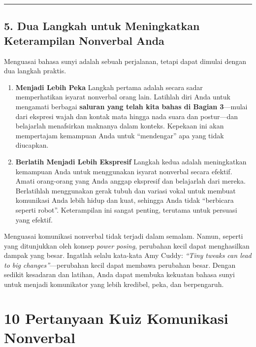 \documentclass[
  letterpaper,
  DIV=11,
  numbers=noendperiod]{scrreprt}
\begin{document}
\begin{center}\rule{0.5\linewidth}{0.5pt}\end{center}

\section{5. Dua Langkah untuk Meningkatkan Keterampilan Nonverbal
Anda}\label{dua-langkah-untuk-meningkatkan-keterampilan-nonverbal-anda}

Menguasai bahasa sunyi adalah sebuah perjalanan, tetapi dapat dimulai
dengan dua langkah praktis.

\begin{enumerate}
\def\labelenumi{\arabic{enumi}.}
\item
  \textbf{Menjadi Lebih Peka} Langkah pertama adalah secara sadar
  memperhatikan isyarat nonverbal orang lain. Latihlah diri Anda untuk
  mengamati berbagai \textbf{saluran yang telah kita bahas di Bagian
  3}---mulai dari ekspresi wajah dan kontak mata hingga nada suara dan
  postur---dan belajarlah menafsirkan maknanya dalam konteks. Kepekaan
  ini akan mempertajam kemampuan Anda untuk ``mendengar'' apa yang tidak
  diucapkan.
\item
  \textbf{Berlatih Menjadi Lebih Ekspresif} Langkah kedua adalah
  meningkatkan kemampuan Anda untuk menggunakan isyarat nonverbal secara
  efektif. Amati orang-orang yang Anda anggap ekspresif dan belajarlah
  dari mereka. Berlatihlah menggunakan gerak tubuh dan variasi vokal
  untuk membuat komunikasi Anda lebih hidup dan kuat, sehingga Anda
  tidak ``berbicara seperti robot''. Keterampilan ini sangat penting,
  terutama untuk persuasi yang efektif.
\end{enumerate}

Menguasai komunikasi nonverbal tidak terjadi dalam semalam. Namun,
seperti yang ditunjukkan oleh konsep \emph{power posing}, perubahan
kecil dapat menghasilkan dampak yang besar. Ingatlah selalu kata-kata
Amy Cuddy: \emph{``Tiny tweaks can lead to big changes''}---perubahan
kecil dapat membawa perubahan besar. Dengan sedikit kesadaran dan
latihan, Anda dapat membuka kekuatan bahasa sunyi untuk menjadi
komunikator yang lebih kredibel, peka, dan berpengaruh.


\chapter{10 Pertanyaan Kuiz Komunikasi
Nonverbal}\label{pertanyaan-kuiz-komunikasi-nonverbal}
\end{document}
